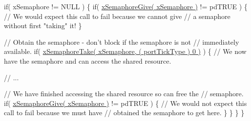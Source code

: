 \begin{DoxyPre}   if( xSemaphore != NULL )
   \{
       if( \hyperlink{semphr_8h_aae55761cabfa9bf85c8f4430f78c0953}{xSemaphoreGive( xSemaphore )} != pdTRUE )
       \{
           // We would expect this call to fail because we cannot give
           // a semaphore without first "taking" it!
       \}\end{DoxyPre}



\begin{DoxyPre}       // Obtain the semaphore - don't block if the semaphore is not
       // immediately available.
       if( \hyperlink{semphr_8h_af116e436d2a5ae5bd72dbade2b5ea930}{xSemaphoreTake( xSemaphore, ( portTickType ) 0 )} )
       \{
           // We now have the semaphore and can access the shared resource.\end{DoxyPre}



\begin{DoxyPre}           // ...\end{DoxyPre}



\begin{DoxyPre}           // We have finished accessing the shared resource so can free the
           // semaphore.
           if( \hyperlink{semphr_8h_aae55761cabfa9bf85c8f4430f78c0953}{xSemaphoreGive( xSemaphore )} != pdTRUE )
           \{
               // We would not expect this call to fail because we must have
               // obtained the semaphore to get here.
           \}
       \}
   \}
\}
\end{DoxyPre}
 